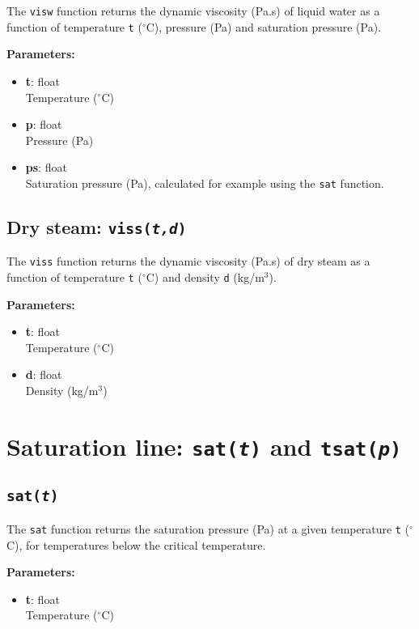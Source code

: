 The \texttt{visw} function returns the dynamic viscosity (Pa.s) of liquid water as a function of temperature \texttt{t} ($^{\circ}$C), pressure (Pa) and saturation pressure (Pa).

\textbf{Parameters:}
\begin{itemize}
\item \textbf{t}: float\\
  Temperature ($^{\circ}$C)
\item \textbf{p}: float\\
  Pressure (Pa)
\item \textbf{ps}: float\\
  Saturation pressure (Pa), calculated for example using the \texttt{sat} function.
\end{itemize}

\subsection{Dry steam: \texttt{viss(\emph{t,d})}}

The \texttt{viss} function returns the dynamic viscosity (Pa.s) of dry steam as a function of temperature \texttt{t} ($^{\circ}$C) and density \texttt{d} (kg/m$^3$).

\textbf{Parameters:}
\begin{itemize}
\item \textbf{t}: float\\
  Temperature ($^{\circ}$C)
\item \textbf{d}: float\\
  Density (kg/m$^3$)
\end{itemize}

\section{Saturation line: \texttt{sat(\emph{t})} and \texttt{tsat(\emph{p})}}

\subsection{\texttt{sat(\emph{t})}}

The \texttt{sat} function returns the saturation pressure (Pa) at a given temperature \texttt{t} ($^{\circ}$C), for temperatures below the critical temperature.

\textbf{Parameters:}
\begin{itemize}
\item \textbf{t}: float\\
  Temperature ($^{\circ}$C)
\end{itemize}

